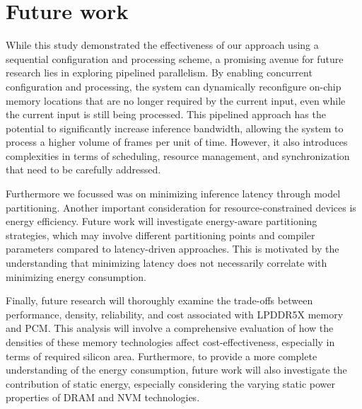 \section{Future work}
While this study demonstrated the effectiveness of our approach using a sequential configuration and processing scheme, a promising avenue for future research lies in exploring pipelined parallelism.
By enabling concurrent configuration and processing, the system can dynamically reconfigure on-chip memory locations that are no longer required by the current input, even while the current input is still being processed.
This pipelined approach has the potential to significantly increase inference bandwidth, allowing the system to process a higher volume of frames per unit of time.
However, it also introduces complexities in terms of scheduling, resource management, and synchronization that need to be carefully addressed.

Furthermore we focussed was on minimizing inference latency through model partitioning.
Another important consideration for resource-constrained devices is energy efficiency.
Future work will investigate energy-aware partitioning strategies, which may involve different partitioning points and compiler parameters compared to latency-driven approaches.
This is motivated by the understanding that minimizing latency does not necessarily correlate with minimizing energy consumption.

Finally, future research will thoroughly examine the trade-offs between performance, density, reliability, and cost associated with LPDDR5X memory and PCM.
This analysis will involve a comprehensive evaluation of how the densities of these memory technologies affect cost-effectiveness, especially in terms of required silicon area.
Furthermore, to provide a more complete understanding of the energy consumption, future work will also investigate the contribution of static energy, especially considering the varying static power properties of DRAM and NVM technologies.